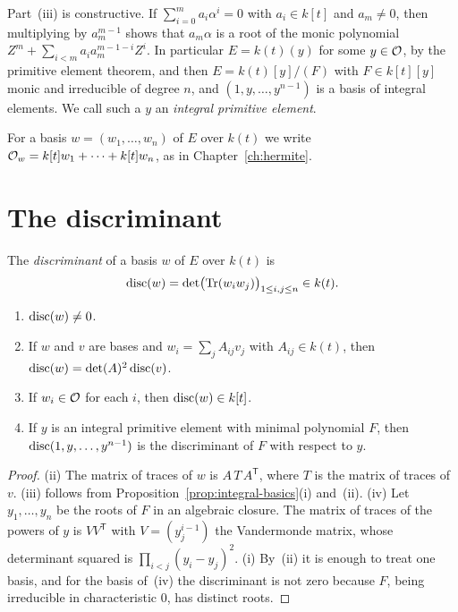 Part~(iii) is constructive. If $\sum_{i=0}^m a_i \alpha^i = 0$ with $a_i \in
k[t]$ and $a_m \ne 0$, then multiplying by $a_m^{m-1}$ shows that $a_m \alpha$
is a root of the monic polynomial $Z^m + \sum_{i<m} a_i a_m^{m-1-i} Z^i$. In
particular $E = k(t)(y)$ for some $y \in \mathcal{O}$, by the primitive element
theorem, and then $E = k(t)[y]/(F)$ with $F \in k[t][y]$ monic and irreducible
of degree $n$, and $(1, y, \dots, y^{n-1})$ is a basis of integral elements.
We call such a $y$ an \emph{integral primitive element}.

For a basis $w = (w_1, \dots, w_n)$ of $E$ over $k(t)$ we write $\mathcal{O}_w = k[t]
w_1 + \dots + k[t] w_n$, as in Chapter~\ref{ch:hermite}.

\section{The discriminant}\label{sec:prelim-disc}

\begin{definition}\label{def:disc}
The \emph{discriminant} of a basis $w$ of $E$ over $k(t)$ is
\[
  \operatorname{disc}(w) = \det\bigl( \operatorname{Tr}(w_i w_j) \bigr)_{1 \le i, j \le n}
  \in k(t) .
\]
\end{definition}

\begin{lemma}\label{lem:disc}
\begin{enumerate}[label=\textup{(\roman*)}]
\item $\operatorname{disc}(w) \ne 0$.
\item If $w$ and $v$ are bases and $w_i = \sum_j A_{ij} v_j$ with $A_{ij} \in
  k(t)$, then $\operatorname{disc}(w) = \det(A)^2 \operatorname{disc}(v)$.
\item If $w_i \in \mathcal{O}$ for each $i$, then $\operatorname{disc}(w) \in k[t]$.
\item If $y$ is an integral primitive element with minimal polynomial $F$,
  then $\operatorname{disc}(1, y, \dots, y^{n-1})$ is the discriminant of $F$ with respect
  to $y$.
\end{enumerate}
\end{lemma}

\begin{proof}
(ii) The matrix of traces of $w$ is $A\, T\, A^{\mathsf T}$, where $T$ is the
matrix of traces of $v$. (iii) follows from
Proposition~\ref{prop:integral-basics}(i) and~(ii). (iv) Let $y_1, \dots, y_n$
be the roots of $F$ in an algebraic closure. The matrix of traces of the
powers of $y$ is $V V^{\mathsf T}$ with $V = (y_j^{i-1})$ the Vandermonde
matrix, whose determinant squared is $\prod_{i<j} (y_i - y_j)^2$. (i) By~(ii)
it is enough to treat one basis, and for the basis of~(iv) the discriminant
is not zero because $F$, being irreducible in characteristic $0$, has
distinct roots.
\end{proof}

